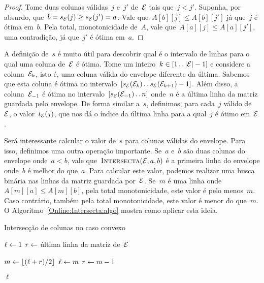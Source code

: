 \begin{proof}
Tome duas colunas válidas~$j$ e~$j'$ de~$\mathcal{E}$ tais que~$j < j'$. Suponha, por absurdo,  que~${b  = s_{\mathcal{E}}(j) \geq s_{\mathcal{E}}(j') = a}$. Vale que~$A[b][j] \leq A[b][j']$ já que~$j$ é ótima em~$b$. Pela total, monotonicidade de~$A$, vale que~$A[a][j] \leq A[a][j']$, uma contradição, já que~$j'$ é ótima em~$a$.
\end{proof}

A definição de~$s$ é muito útil para descobrir qual é o intervalo de linhas para o qual uma coluna de~$\mathcal{E}$ é ótima. Tome um inteiro~$k \in [1 \,.\,.\, |\mathcal{E}|-1]$ e considere a coluna~$\mathcal{E}_k$, isto é, uma coluna válida do envelope diferente da última. Sabemos que esta coluna é ótima no intervalo~$[s_{\mathcal{E}}(\mathcal{E}_k) \,.\,.\, s_{\mathcal{E}}(\mathcal{E}_{k+1}) - 1]$. Além disso, a coluna~$\mathcal{E}_{-1}$ é ótima no intervalo~$[s_{\mathcal{E}}(\mathcal{E}_{-1}) \,.\,.\, n]$ onde~$n$ é a última linha da matriz guardada pelo envelope. De forma similar a~$s$, definimos, para cada~$j$ válido de~$\mathcal{E}$, o valor~$t_{\mathcal{E}}(j)$, que nos dá o índice da última linha para a qual~$j$ é ótimo em~$\mathcal{E}$.

Será interessante calcular o valor de~$s$ para colunas válidas do envelope. Para isso, definimos uma outra operação importante. Se~$a$ e~$b$ são duas colunas do envelope onde~$a < b$, vale que~$\textsc{Intersecta}(\mathcal{E},a,b)$ é a primeira linha do envelope onde~$b$ é melhor do que~$a$. Para calcular este valor, podemos realizar uma busca binária nas linhas da matriz guardada por~$\mathcal{E}$. Se~$m$ é uma linha onde~$A[m][a] \leq A[m][b]$, pela total monotonicidade, este valor é pelo menos~$m$. Caso contrário, também pela total monotonicidade, este valor é menor do que~$m$. O Algoritmo~\ref{Online:Intersecta:algo} mostra como aplicar esta ideia.

\begin{algorithm}[h]
\caption{Intersecção de colunas no caso convexo}
\label{Online:Intersecta:algo}
\begin{algorithmic}[1]
    \State $\ell \leftarrow 1$
    \State $r \leftarrow $ última linha da matriz de~$\mathcal{E}$

        \State $m \leftarrow \lfloor(\ell+r)/2\rfloor$
         \label{Online:Intersecta:algo:comp}
            \State $\ell \leftarrow m$
        \Else
            \State $r \leftarrow m-1$
        \EndIf
    \EndWhile

    \State \Return $\ell$
\EndFunction
\end{algorithmic}
\end{algorithm}

